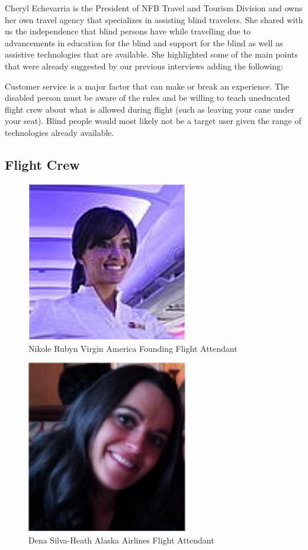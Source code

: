 \documentclass[a4paper, 12pt,conference]{new_cit_thesis}
\begin{document}
Cheryl Echevarria is the President of NFB Travel and Tourism Division and owns her own travel agency that specializes in assisting blind travelers.  She shared with us the independence that blind persons have while travelling due to advancements in education for the blind and support for the blind as well as assistive technologies that are available.  She highlighted some of the main points that were already suggested by our previous interviews adding the following:

\begin{list}{-}{}
  \item Customer service is a major factor that can make or break an experience. The disabled person must be aware of the rules and be willing to teach uneducated flight crew about what is allowed during flight (such as leaving your cane under your seat). Blind people would most likely not be a target user given the range of technologies already available.
\end{list}

\subsection{Flight Crew}

\begin{figure}[h]
  \centering
     \includegraphics[width=7cm]{images/image029}
   \caption{Nikole Rubyn Virgin America Founding Flight Attendant}
  \label{fig:29}
\end{figure}

\begin{figure}[h]
  \centering
     \includegraphics[width=7cm]{images/image030}
   \caption{Dena Silva-Heath Alaska Airlines Flight Attendant}
  \label{fig:30}
\end{figure}
\end{document}
